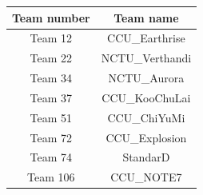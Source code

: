\documentclass[10pt,oneside]{article}
\begin{document}
\begin{landscape}
\begin{multicols}{2}
\begin{tabular}{|c|c|}
	\hline 
	Team number &  Team name \\ 
	\hline 
	Team 12 & CCU\_Earthrise \\ 
	\hline 
	Team 22 & NCTU\_Verthandi \\ 
	\hline 
	Team 34 & NCTU\_Aurora \\ 
	\hline 
	Team 37 & CCU\_KooChuLai \\ 
	\hline 
	Team 51 & CCU\_ChiYuMi \\ 
	\hline 
	Team 72 & CCU\_Explosion \\ 
	\hline 
	Team 74 & StandarD \\ 
	\hline 
	Team 106 & CCU\_NOTE7 \\ 
	\hline 
\end{tabular} 



\end{multicols}
\end{landscape}
\end{document}
